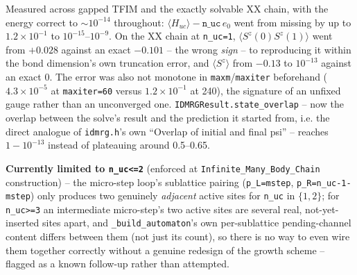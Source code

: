 \documentclass[11pt]{article}
\begin{document}
Measured across gapped TFIM and the exactly solvable XX chain, with the
energy correct to ${\sim}10^{-14}$ throughout:
$\langle H_{uc}\rangle - \texttt{n\_uc}\,e_0$ went from missing by up to
$1.2\times10^{-1}$ to $10^{-15}$--$10^{-9}$. On the XX chain at
\texttt{n\_uc=1}, $\langle S^z(0)S^z(1)\rangle$ went from $+0.028$ against
an exact $-0.101$ -- the wrong \emph{sign} -- to reproducing it within the
bond dimension's own truncation error, and $\langle S^z\rangle$ from
$-0.13$ to $10^{-13}$ against an exact 0. The error was also not monotone
in \texttt{maxm}/\texttt{maxiter} beforehand ($4.3\times10^{-5}$ at
\texttt{maxiter=60} versus $1.2\times10^{-1}$ at 240), the signature of an
unfixed gauge rather than an unconverged one.
\texttt{IDMRGResult.state\_overlap} -- now the overlap between the solve's
result and the prediction it started from, i.e. the direct analogue of
\texttt{idmrg.h}'s own ``Overlap of initial and final psi'' -- reaches
$1-10^{-13}$ instead of plateauing around 0.5--0.65.

\textbf{Currently limited to \texttt{n\_uc<=2}} (enforced at
\texttt{Infinite\_Many\_Body\_Chain} construction) -- the micro-step
loop's sublattice pairing (\texttt{p\_L=mstep},
\texttt{p\_R=n\_uc-1-mstep}) only produces two genuinely \emph{adjacent}
active sites for \texttt{n\_uc} in $\{1, 2\}$; for \texttt{n\_uc>=3} an
intermediate micro-step's two active sites are several real,
not-yet-inserted sites apart, and \texttt{\_build\_automaton}'s own
per-sublattice pending-channel content differs between them (not just
its count), so there is no way to even wire them together correctly
without a genuine redesign of the growth scheme -- flagged as a known
follow-up rather than attempted.
\end{document}
